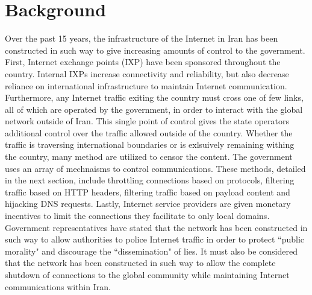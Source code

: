 \section{Background}\label{sec:background}

Over the past 15 years, the infrastructure of the Internet in Iran has been constructed in such way to give increasing amounts of control to the government. First, Internet exchange points (IXP) have been sponsored throughout the country. Internal IXPs increase connectivity and reliability, but also decrease reliance on international infrastructure to maintain Internet communication. Furthermore, any Internet traffic exiting the country must cross one of few links, all of which are operated by the government, in order to interact with the global network outside of Iran. This single point of control gives the state operators additional control over the traffic allowed outside of the country. Whether the traffic is traversing international boundaries or is exlsuively remaining withing the country, many method are utilized to censor the content. The government uses an array of mechnaisms to control communications. These methods, detailed in the next section, include throttling connections based on protocols, filtering traffic based on HTTP headers, filtering traffic based on payload content and hijacking DNS requests. Lastly, Internet service providers are given monetary incentives to limit the connections they facilitate to only local domains. Government representatives have stated that the network has been constructed in such way to allow authorities to police Internet traffic in order to protect ``public morality" and discourage the ``dissemination" of lies. It must also be considered that the network has been constructed in such way to allow the complete shutdown of connections to the global community while maintaining Internet communications within Iran.
